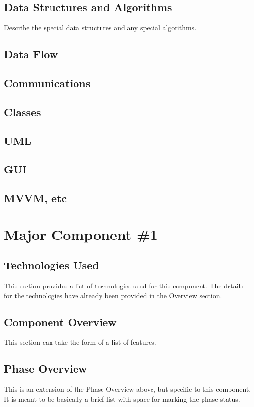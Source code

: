  \subsection{Data Structures and Algorithms}
 Describe the special data structures and any special algorithms.
 
 \subsection{Data Flow}
 
 \subsection{Communications}
 
 \subsection{Classes}
 
 \subsection{UML}
 
 \subsection{GUI}
 
 \subsection{MVVM, etc}

\section{Major Component \#1 }

\subsection{Technologies  Used}
This section provides a list of technologies used for this component.  The details 
for the technologies have already been provided in the Overview section. 

\subsection{Component  Overview}
This section can take the form of a list of features. 

\subsection{Phase Overview}
This is an extension of the Phase Overview above, but specific to this component. 
 It is meant to be basically a brief list with space for marking the phase status. 

